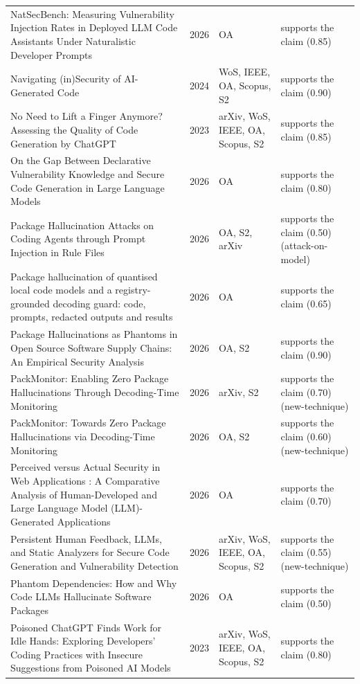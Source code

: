 \begin{longtable}{@{}%
  >{\raggedright\arraybackslash}p{}c%
  >{\raggedright\arraybackslash}p{}%
  >{\raggedright\arraybackslash}p{}@{}}
NatSecBench: Measuring Vulnerability Injection Rates in Deployed LLM Code Assistants Under Naturalistic Developer Prompts & 2026 & OA & supports the claim (0.85) \\
Navigating (in)Security of AI-Generated Code & 2024 & WoS, IEEE, OA, Scopus, S2 & supports the claim (0.90) \\
No Need to Lift a Finger Anymore? Assessing the Quality of Code Generation by ChatGPT & 2023 & arXiv, WoS, IEEE, OA, Scopus, S2 & supports the claim (0.85) \\
On the Gap Between Declarative Vulnerability Knowledge and Secure Code Generation in Large Language Models & 2026 & OA & supports the claim (0.80) \\
Package Hallucination Attacks on Coding Agents through Prompt Injection in Rule Files & 2026 & OA, S2, arXiv & supports the claim (0.50) (attack-on-model) \\
Package hallucination of quantised local code models and a registry-grounded decoding guard: code, prompts, redacted outputs and results & 2026 & OA & supports the claim (0.65) \\
Package Hallucinations as Phantoms in Open Source Software Supply Chains: An Empirical Security Analysis & 2026 & OA, S2 & supports the claim (0.90) \\
PackMonitor: Enabling Zero Package Hallucinations Through Decoding-Time Monitoring & 2026 & arXiv, S2 & supports the claim (0.70) (new-technique) \\
PackMonitor: Towards Zero Package Hallucinations via Decoding-Time Monitoring & 2026 & OA, S2 & supports the claim (0.60) (new-technique) \\
Perceived versus Actual Security in Web Applications : A Comparative Analysis of Human-Developed and Large Language Model (LLM)-Generated Applications & 2026 & OA & supports the claim (0.70) \\
Persistent Human Feedback, LLMs, and Static Analyzers for Secure Code Generation and Vulnerability Detection & 2026 & arXiv, WoS, IEEE, OA, Scopus, S2 & supports the claim (0.55) (new-technique) \\
Phantom Dependencies: How and Why Code LLMs Hallucinate Software Packages & 2026 & OA & supports the claim (0.50) \\
Poisoned ChatGPT Finds Work for Idle Hands: Exploring Developers' Coding Practices with Insecure Suggestions from Poisoned AI Models & 2023 & arXiv, WoS, IEEE, OA, Scopus, S2 & supports the claim (0.80) \\

\end{longtable}
